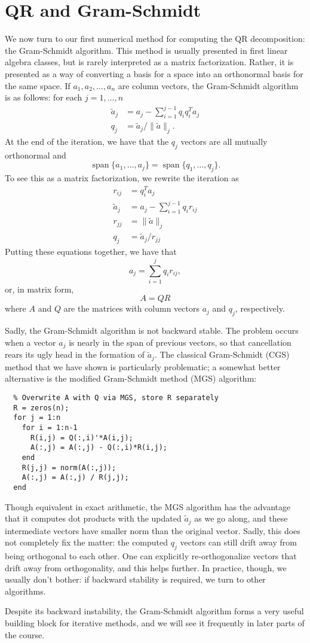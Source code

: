 \section{QR and Gram-Schmidt}

We now turn to our first numerical method for computing the
QR decomposition: the Gram-Schmidt algorithm.  This method is
usually presented in first linear algebra classes, but is
rarely interpreted as a matrix factorization.  Rather, it is
presented as a way of converting a basis for a space into an
orthonormal basis for the same space.  If $a_1, a_2, \ldots, a_n$
are column vectors, the Gram-Schmidt algorithm is as follows:
for each $j = 1, \ldots, n$
\begin{align*}
  \tilde{a}_j &= a_j - \sum_{i=1}^{j-1} q_i q_i^T a_j \\
  q_j &= \tilde{a}_j / \|\tilde{a}\|_j.
\end{align*}
At the end of the iteration, we have that the $q_j$ vectors are
all mutually orthonormal and
\[
  \operatorname{span}\{ a_1, \ldots, a_j \} =
  \operatorname{span}\{ q_1, \ldots, q_j \}.
\]
To see this as a matrix factorization, we rewrite the iteration as
\begin{align*}
  r_{ij} &= q_i^T a_j \\
  \tilde{a}_j &= a_j - \sum_{i=1}^{j-1} q_i r_{ij} \\
  r_{jj} &= \|\tilde{a}\|_j \\
  q_j &= \tilde{a}_j / r_{jj}
\end{align*}
Putting these equations together, we have that
\[
  a_j = \sum_{i=1}^j q_i r_{ij},
\]
or, in matrix form,
\[
  A = QR
\]
where $A$ and $Q$ are the matrices with column vectors $a_j$ and $q_j$,
respectively.

Sadly, the Gram-Schmidt algorithm is not backward stable.
The problem occurs when a vector $a_j$ is nearly in the span of
previous vectors, so that cancellation rears its ugly head in the
formation of $\tilde{a}_j$.  The
classical Gram-Schmidt (CGS) method that we have shown is particularly
problematic; a somewhat better alternative is the modified Gram-Schmidt
method (MGS) algorithm:
\begin{lstlisting}
  % Overwrite A with Q via MGS, store R separately
  R = zeros(n);
  for j = 1:n
    for i = 1:n-1
      R(i,j) = Q(:,i)'*A(i,j);
      A(:,j) = A(:,j) - Q(:,i)*R(i,j);
    end
    R(j,j) = norm(A(:,j));
    A(:,j) = A(:,j) / R(j,j);
  end
\end{lstlisting}
Though equivalent in exact arithmetic, the MGS algorithm has the advantage
that it computes dot products with the updated $\tilde{a}_j$ as we go
along, and these intermediate vectors have smaller norm than the original
vector.  Sadly, this does not completely fix the matter: the computed $q_j$
vectors can still drift away from being orthogonal to each other.  One can
explicitly re-orthogonalize vectors that drift away from orthogonality,
and this helps further.  In practice, though, we usually don't bother: if
backward stability is required, we turn to other algorithms.

Despite its backward instability, the Gram-Schmidt algorithm forms a very
useful building block for iterative methods, and we will see it frequently
in later parts of the course.
